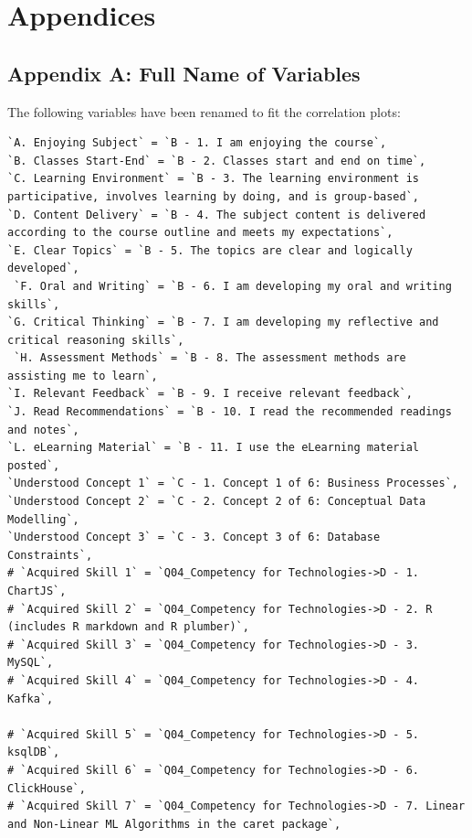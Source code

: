 \documentclass[
]{article}
\begin{document}
\newpage

\section{Appendices}\label{appendices}

\subsection{Appendix A: Full Name of
Variables}\label{appendix-a-full-name-of-variables}

The following variables have been renamed to fit the correlation plots:

\begin{verbatim}
`A. Enjoying Subject` = `B - 1. I am enjoying the course`,
`B. Classes Start-End` = `B - 2. Classes start and end on time`,
`C. Learning Environment` = `B - 3. The learning environment is participative, involves learning by doing, and is group-based`,
`D. Content Delivery` = `B - 4. The subject content is delivered according to the course outline and meets my expectations`,
`E. Clear Topics` = `B - 5. The topics are clear and logically developed`,
 `F. Oral and Writing` = `B - 6. I am developing my oral and writing skills`,
`G. Critical Thinking` = `B - 7. I am developing my reflective and critical reasoning skills`,
 `H. Assessment Methods` = `B - 8. The assessment methods are assisting me to learn`,
`I. Relevant Feedback` = `B - 9. I receive relevant feedback`,
`J. Read Recommendations` = `B - 10. I read the recommended readings and notes`,
`L. eLearning Material` = `B - 11. I use the eLearning material posted`,
`Understood Concept 1` = `C - 1. Concept 1 of 6: Business Processes`,
`Understood Concept 2` = `C - 2. Concept 2 of 6: Conceptual Data Modelling`,
`Understood Concept 3` = `C - 3. Concept 3 of 6: Database Constraints`,
# `Acquired Skill 1` = `Q04_Competency for Technologies->D - 1. ChartJS`,
# `Acquired Skill 2` = `Q04_Competency for Technologies->D - 2. R (includes R markdown and R plumber)`,
# `Acquired Skill 3` = `Q04_Competency for Technologies->D - 3. MySQL`,
# `Acquired Skill 4` = `Q04_Competency for Technologies->D - 4. Kafka`,

# `Acquired Skill 5` = `Q04_Competency for Technologies->D - 5. ksqlDB`,
# `Acquired Skill 6` = `Q04_Competency for Technologies->D - 6. ClickHouse`,
# `Acquired Skill 7` = `Q04_Competency for Technologies->D - 7. Linear and Non-Linear ML Algorithms in the caret package`,


\end{verbatim}
\end{document}
